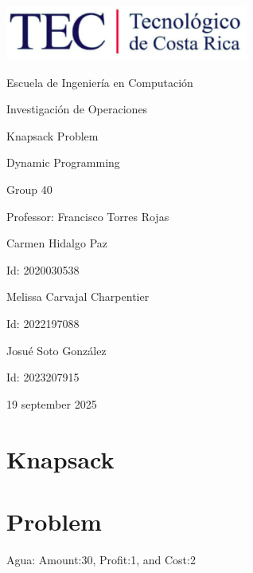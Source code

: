 \documentclass{article}
\begin{document}
\begin{titlepage}
    \centering
    \includegraphics[width=0.6\textwidth]{logo-tec.png}\par\vspace{1cm}

    {\large Escuela de Ingeniería en Computación\par}
    {\large Investigación de Operaciones\par}
    \vspace{2cm}

    {\Large Knapsack Problem\par}
    {\large Dynamic Programming\par}
    \vspace{2cm}

    {\large Group 40\par}
    {\large Professor: Francisco Torres Rojas\par}
    \vspace{3cm}

    {\large Carmen Hidalgo Paz\par}
    {\large Id: 2020030538\par}
    \vspace{1cm}
    {\large Melissa Carvajal Charpentier\par}
    {\large Id: 2022197088\par}
    \vspace{1cm}
    {\large Josué Soto González\par}
    {\large Id: 2023207915\par}
    \vspace{1cm}

    {\large 19 september 2025\par}
\end{titlepage}

\newpage


\section{Knapsack}
\section{Problem}
Agua: Amount:30, Profit:1, and Cost:2
\end{document}
